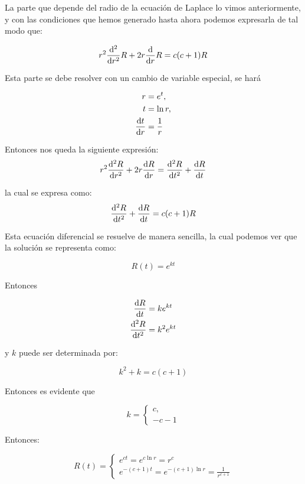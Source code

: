 \documentclass[11pt]{report}
\theoremstyle{plain}
\theoremstyle{definition}
\begin{document}

La parte que depende del radio de la ecuación de Laplace lo vimos anteriormente, y con las condiciones que hemos generado hasta ahora podemos expresarla de tal modo que:

\begin{equation*}
	r^2\dv[2]{r}R+2r\dv{r}R=c(c+1)R
\end{equation*}

Esta parte se debe resolver con un cambio de variable especial, se hará

\begin{align*}
	r&=e^t,\\
	t&=\ln{r},\\
	\dv{t}{r}&=\frac{1}{r}
\end{align*}

Entonces nos queda la siguiente expresión:
\begin{equation*}
	r^2\dv[2]{R}{r}+2r\dv{R}{r}=\dv[2]{R}{t}+\dv{R}{t}
\end{equation*}

la cual se expresa como:
\begin{equation*}
	\dv[2]{R}{t}+\dv{R}{t}=c(c+1)R
\end{equation*}

Esta ecuación diferencial se resuelve de manera sencilla, la cual podemos ver que la solución se representa como:

\begin{equation*}
	R(t)=e^{kt}
\end{equation*}

Entonces

\begin{align*}
	\dv{R}{t}&=ke^{kt}\\
	\dv[2]{R}{t}&=k^2e^{kt}
\end{align*}

y $k$ puede ser determinada por:

\begin{equation*}
	k^2+k=c(c+1)
\end{equation*}

Entonces es evidente que

\begin{equation*}
	k=
	\begin{cases}
		c,\\
		-c-1
	\end{cases}
\end{equation*}

Entonces:

\begin{equation*}
	R(t)=
	\begin{cases}
		e^{ct}=e^{c\ln{r}}=r^c\\
		e^{-(c+1)t}=e^{-(c+1)\ln{r}}=\frac{1}{r^{c+1}}
	\end{cases}
\end{equation*}
\end{document}
